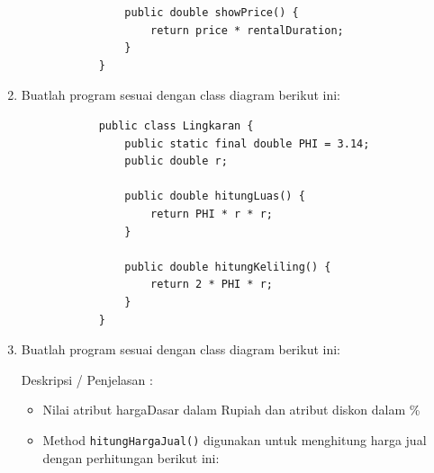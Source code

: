 \documentclass[12pt,titlepage]{article}
\begin{document}
\begin{enumerate}
{\begin{verbatim}
                public double showPrice() {
                    return price * rentalDuration;
                }
            }
        \end{verbatim}
    }
    \item {
        Buatlah program sesuai dengan class diagram berikut ini:


        \begin{verbatim}
            public class Lingkaran {
                public static final double PHI = 3.14;
                public double r;

                public double hitungLuas() {
                    return PHI * r * r;
                }

                public double hitungKeliling() {
                    return 2 * PHI * r;
                }
            }
        \end{verbatim}
    }
    \pagebreak
    \item {
        Buatlah program sesuai dengan class diagram berikut ini:


        Deskripsi / Penjelasan :
        \begin{itemize}
            \item Nilai atribut hargaDasar dalam Rupiah dan atribut diskon dalam \%
            \item {
                Method \texttt{hitungHargaJual()} digunakan untuk menghitung harga jual dengan
                perhitungan berikut ini:

}
\end{itemize}}
\end{enumerate}
\end{document}
